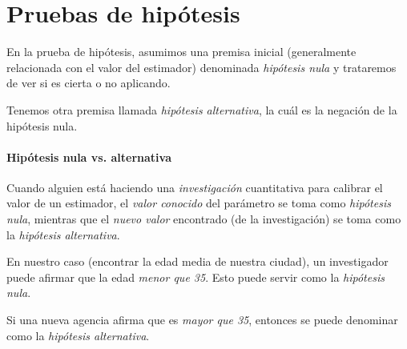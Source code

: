 \section{Pruebas de hipótesis}
% 
% 


En la prueba de hipótesis, asumimos una
premisa inicial (generalmente relacionada con el valor del estimador) denominada \emph{hipótesis nula}  y
trataremos de ver si es cierta o no aplicando.



Tenemos otra premisa llamada \emph{hipótesis alternativa}, la cuál es la negación de la hipótesis nula.


\paragraph{Hipótesis nula vs. alternativa}
%
%
% 
%
% 
Cuando alguien está haciendo una \emph{investigación} cuantitativa para calibrar el valor de un estimador,  el \emph{valor conocido} del parámetro se toma como \emph{hipótesis nula},  mientras que el \emph{nuevo valor} encontrado (de la investigación) se toma como la \emph{hipótesis alternativa}.



En nuestro caso (encontrar la edad media de nuestra ciudad), un investigador puede afirmar que la edad
\emph{menor que 35}. Esto puede servir como la \emph{hipótesis nula}.


Si una nueva agencia afirma
que es \emph{mayor que 35}, entonces se puede denominar como la \emph{hipótesis alternativa}.

